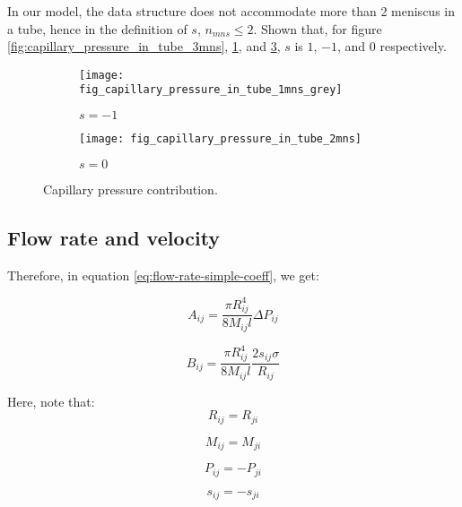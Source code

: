 	In our model, the data structure does not accommodate more than 2 meniscus in a tube, hence in the definition of $s$, $n_{mns} \le 2$. Shown that, for figure \ref{fig:capillary_pressure_in_tube_3mns}, \ref{fig:capillary_pressure_in_tube_1mns_grey}, and \ref{fig:capillary_pressure_in_tube_2mns}, $s$ is $1$, $-1$, and $0$ respectively.
	
	\begin{figure}[H]
		\centering
		\begin{subfigure}{0.45\textwidth}
			\centering
			\texttt{[image: fig\_capillary\_pressure\_in\_tube\_1mns\_grey]}
			\caption{$s = -1$}
			\label{fig:capillary_pressure_in_tube_1mns_grey}
		\end{subfigure}
		\hfill
		\begin{subfigure}{0.48\textwidth}
			\centering
			\texttt{[image: fig\_capillary\_pressure\_in\_tube\_2mns]}
			\caption{$s = 0$}
			\label{fig:capillary_pressure_in_tube_2mns}
		\end{subfigure}
		\caption{Capillary pressure contribution.}
	\end{figure}
		
	
\subsection{Flow rate and velocity} \label{sec:flow-rate-vel}
	Therefore, in equation \ref{eq:flow-rate-simple-coeff}, we get:
	
	\begin{equation} \label{eq:flow-rate-aij}
		A_{ij} = \frac{\pi R_{ij}^4}{8M_{ij}l} \Delta P_{ij}
	\end{equation}
	
	\begin{equation} \label{eq:flow-rate-bij}
		B_{ij} = \frac{\pi R_{ij}^4}{8M_{ij}l} \frac{2 s_{ij} \sigma}{R_{ij}}
	\end{equation}
	
	Here, note that:
	\begin{equation}
		R_{ij} = R_{ji}
	\end{equation}
	
	\begin{equation}
		M_{ij} = M_{ji}
	\end{equation}
	
	\begin{equation}
		P_{ij} = -P_{ji}
	\end{equation}
	
	\begin{equation}
		s_{ij} = -s_{ji}
	\end{equation}
	
